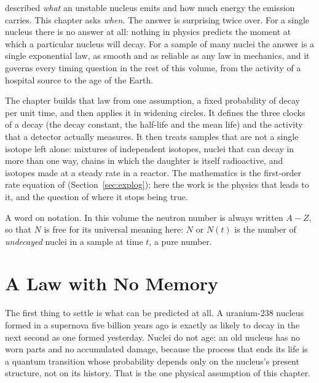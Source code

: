 
 described \emph{what} an unstable nucleus emits and how much energy the emission
carries. This chapter asks \emph{when}. The answer is surprising twice over. For a single nucleus there
is no answer at all: nothing in physics predicts the moment at which a particular nucleus will decay.
For a sample of many nuclei the answer is a single exponential law, as smooth and as reliable as any
law in mechanics, and it governs every timing question in the rest of this volume, from the activity of
a hospital source to the age of the Earth.

The chapter builds that law from one assumption, a fixed probability of decay per unit time, and then
applies it in widening circles. It defines the three clocks of a decay (the decay constant, the
half-life and the mean life) and the activity that a detector actually measures. It then treats
samples that are not a single isotope left alone: mixtures of independent isotopes, nuclei that can
decay in more than one way, chains in which the daughter is itself radioactive, and isotopes made at a
steady rate in a reactor. The mathematics is the first-order rate equation of 
(Section~\ref{sec:explog}); here the work is the physics that leads to it, and the question of where it
stops being true.

A word on notation. In this volume the neutron number is always written $A-Z$, so that $N$ is free for
its universal meaning here: $N$ or $N(t)$ is the number of \emph{undecayed} nuclei in a sample at time
$t$, a pure number.


\section{A Law with No Memory}\label{sec:decaylaw-memory}

The first thing to settle is what can be predicted at all. A uranium-238 nucleus formed in a supernova
five billion years ago is exactly as likely to decay in the next second as one formed yesterday.
Nuclei do not age: an old nucleus has no worn parts and no accumulated damage, because the process that
ends its life is a quantum transition whose probability depends only on the nucleus's present
structure, not on its history. That is the one physical assumption of this chapter.

